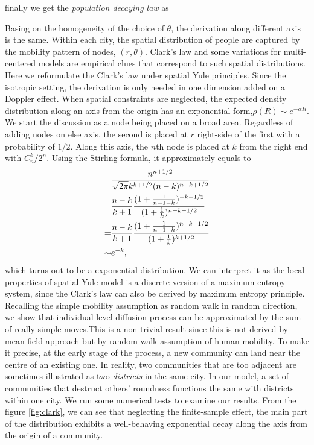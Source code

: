 \documentclass[aps,prl]{revtex4-2}
\begin{document}
finally we get the \emph{population decaying law} as 

Basing on the homogeneity of the choice of $\theta$, the derivation along different axis is the same. Within each city, the spatial distribution of people are captured by the mobility pattern of nodes, $(r,\theta)$. Clark's law\cite{clark1951urban} and some variations for multi-centered models\cite{griffith1981modelling} are empirical clues that correspond to such spatial distributions. Here we reformulate the Clark's law under spatial Yule principles. Since the isotropic setting, the derivation is only needed in one dimension added on a Doppler effect. When spatial constraints are neglected, the expected density distribution along an axis from the origin has an exponential form,$\rho (R)\sim e^{-\alpha R}$. We start the discussion as a node being placed on a broad area. Regardless of adding nodes on else axis, the second is placed at $r$ right-side of the first with a probability of $1/2$. Along this axis, the $n$th node is placed at $k$ from the right end with $C_n^k/2^n$. Using the Stirling formula, it approximately equals to \begin{align}
    & \frac{n^{n+1/2}}{\sqrt{2\pi}k^{k+1/2}(n-k)^{n-k+1/2}}\notag                         \\
=    & \frac{n-k}{k+1}\frac{(1+\frac{1}{n-1-k})^{-k-1/2}}{(1+\frac{1}{k})^{n-k-1/2}}\notag \\
=    & \frac{n-k}{k+1}\frac{(1+\frac{1}{n-1-k})^{n-k-1/2}}{(1+\frac{1}{k})^{k+1/2}}\notag  \\
\sim & e^{-k},
\end{align}
which turns out to be a exponential distribution. We can interpret it as the local properties of spatial Yule model is a discrete version of a maximum entropy system, since the Clark's law can also be derived by maximum entropy principle\cite{merity2009accurate}. Recalling the simple mobility assumption as random walk in random direction, we show that individual-level diffusion process can be approximated by the sum of really simple moves.This is a non-trivial result since this is not derived by mean field approach but by random walk assumption of human mobility. To make it precise, at the early stage of the process, a new community can land near the centre of an existing one. In reality, two communities that are too adjacent are sometimes illustrated as two \emph{districts} in the same city. In our model, a set of communities that destruct others' roundness functions the same with districts within one city. We run some numerical tests to examine our results. From the figure \ref{fig:clark}, we can see that neglecting the finite-sample effect, the main part of the distribution exhibits a well-behaving exponential decay along the axis from the origin of a community.
\end{document}
